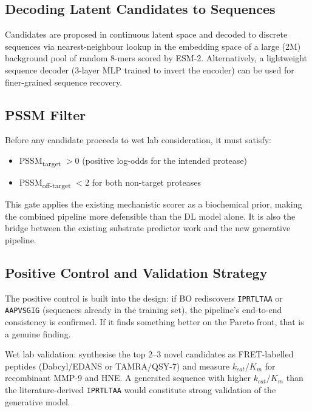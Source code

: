 \documentclass[10pt,a4paper]{article}
\newcommand{\seq}[1]{\texttt{#1}}
\begin{document}
\subsection{Decoding Latent Candidates to Sequences}

Candidates are proposed in continuous latent space and decoded to discrete
sequences via nearest-neighbour lookup in the embedding space of a large
(2M) background pool of random 8-mers scored by ESM-2.  Alternatively,
a lightweight sequence decoder (3-layer MLP trained to invert the encoder)
can be used for finer-grained sequence recovery.

\subsection{PSSM Filter}

Before any candidate proceeds to wet lab consideration, it must satisfy:
\begin{itemize}[topsep=2pt,itemsep=0pt,leftmargin=*]
  \item PSSM\textsubscript{target} $> 0$ (positive log-odds for the intended protease)
  \item PSSM\textsubscript{off-target} $< 2$ for both non-target proteases
\end{itemize}
This gate applies the existing mechanistic scorer as a biochemical prior,
making the combined pipeline more defensible than the DL model alone.
It is also the bridge between the existing substrate predictor work and the
new generative pipeline.

\subsection{Positive Control and Validation Strategy}

The positive control is built into the design: if BO rediscovers
\seq{IPRTLTAA} or \seq{AAPVSGIG} (sequences already in the training set),
the pipeline's end-to-end consistency is confirmed.  If it finds something
better on the Pareto front, that is a genuine finding.

Wet lab validation: synthesise the top 2--3 novel candidates as
FRET-labelled peptides (Dabcyl/EDANS or TAMRA/QSY-7) and measure
$k_{cat}/K_m$ for recombinant MMP-9 and HNE.  A generated sequence
with higher $k_{cat}/K_m$ than the literature-derived \seq{IPRTLTAA}
would constitute strong validation of the generative model.

\end{document}
